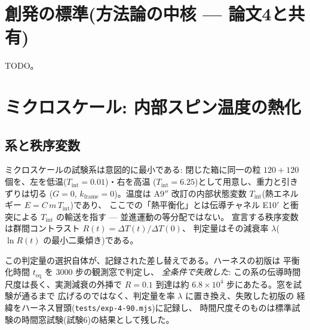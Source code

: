 \documentclass[a4paper,10pt,twocolumn]{ltjsarticle}
\begin{document}
\section{創発の標準(方法論の中核 — 論文4と共有)}
TODO。

\section{ミクロスケール: 内部スピン温度の熱化}

\subsection{系と秩序変数}

ミクロスケールの試験系は意図的に最小である: 閉じた箱に同一の粒
$120+120$ 個を、左を低温($T_{\mathrm{int}}=0.01$)・右を高温
($T_{\mathrm{int}}=6.25$)として用意し、重力と引きずりは切る
($G=0$, $k_{\mathrm{frame}}=0$)。温度は A9$''$ 改訂の内部状態変数
$T_{\mathrm{int}}$(熱エネルギー $E=C\,m\,T_{\mathrm{int}}$)であり、
ここでの「熱平衡化」とは伝導チャネル E10$'$ と衝突による
$T_{\mathrm{int}}$ の輸送を指す — 並進運動の等分配ではない。
宣言する秩序変数は群間コントラスト $R(t)=\Delta T(t)/\Delta T(0)$、
判定量はその減衰率 $\lambda$($\ln R(t)$ の最小二乗傾き)である。

この判定量の選択自体が、記録された差し替えである。ハーネスの初版は
平衡化時間 $t_{\mathrm{eq}}$ を 3000 步の観測窓で判定し、
\emph{全条件で失敗した}: この系の伝導時間尺度は長く、実測減衰の外挿で
$R=0.1$ 到達は約 $6.8\times10^{4}$ 步にあたる。窓を試験が通るまで
広げるのではなく、判定量を率 $\lambda$ に置き換え、失敗した初版の
経緯をハーネス冒頭(\texttt{tests/exp-4-90.mjs})に記録し、
時間尺度そのものは標準試験の時間窓試験(試験6)の結果として残した。
\end{document}
